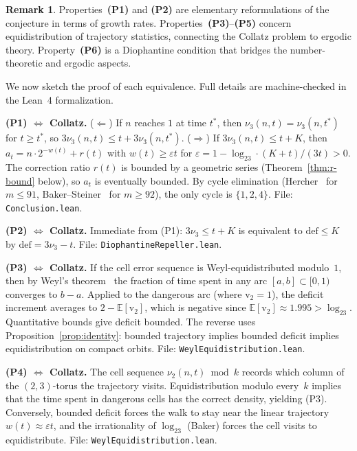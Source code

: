 \documentclass{CUP-JNL-FMP}%
\theoremstyle{definition}
\newtheorem{remark}[theorem]{Remark}
\numberwithin{equation}{section}
\newcommand{\val}{\mathrm{v}_2}
\newcommand{\deficit}{\mathrm{def}}
\newcommand{\logb}{\log_2}
\begin{document}
\begin{remark}
  Properties~\textbf{(P1)} and \textbf{(P2)} are elementary reformulations of
  the conjecture in terms of growth rates. Properties~\textbf{(P3)}--\textbf{(P5)}
  concern equidistribution of trajectory statistics, connecting the Collatz problem
  to ergodic theory. Property~\textbf{(P6)} is a Diophantine condition that
  bridges the number-theoretic and ergodic aspects.
\end{remark}

We now sketch the proof of each equivalence.  Full details
are machine-checked in the Lean~4 formalization.

\medskip\noindent\textbf{(P1) $\Leftrightarrow$ Collatz.}
($\Leftarrow$) If $n$ reaches $1$ at time $t^*$, then $\nu_3(n,t) = \nu_3(n,t^*)$
for $t \geq t^*$, so $3\nu_3(n,t) \leq t + 3\nu_3(n,t^*)$.
($\Rightarrow$) If $3\nu_3(n,t) \leq t + K$, then
$a_t = n \cdot 2^{-w(t)} + r(t)$ with $w(t) \geq \varepsilon t$ for
$\varepsilon = 1 - \logb 3 \cdot (K+t)/(3t) > 0$.  The correction ratio
$r(t)$ is bounded by a geometric series (Theorem~\ref{thm:r-bound} below),
so $a_t$ is eventually bounded.  By cycle elimination
(Hercher~\cite{Hercher2023} for $m \leq 91$, Baker--Steiner~\cite{Steiner1977}
for $m \geq 92$), the only cycle is $\{1,2,4\}$.
File: \texttt{Conclusion.lean}.

\medskip\noindent\textbf{(P2) $\Leftrightarrow$ Collatz.}
Immediate from (P1): $3\nu_3 \leq t + K$ is equivalent to $\deficit \leq K$
by $\deficit = 3\nu_3 - t$.  File: \texttt{DiophantineRepeller.lean}.

\medskip\noindent\textbf{(P3) $\Leftrightarrow$ Collatz.}
If the cell error sequence is Weyl-equidistributed modulo~$1$, then by
Weyl's theorem~\cite{Weyl1916} the fraction of time spent in any arc
$[a,b] \subset [0,1)$ converges to $b-a$.  Applied to the dangerous arc
(where $\val = 1$), the deficit increment averages to $2 - \mathbb{E}[\val]$,
which is negative since $\mathbb{E}[\val] \approx 1.995 > \logb 3$.
Quantitative bounds give deficit bounded.  The reverse uses
Proposition~\ref{prop:identity}: bounded trajectory implies bounded deficit
implies equidistribution on compact orbits.
File: \texttt{WeylEquidistribution.lean}.

\medskip\noindent\textbf{(P4) $\Leftrightarrow$ Collatz.}
The cell sequence $\nu_2(n,t) \bmod k$ records which column of the
$(2,3)$-torus the trajectory visits.  Equidistribution modulo every~$k$
implies that the time spent in dangerous cells has the correct density,
yielding (P3).  Conversely, bounded deficit forces the walk to stay near
the linear trajectory $w(t) \approx \varepsilon t$, and the irrationality
of $\logb 3$ (Baker) forces the cell visits to equidistribute.
File: \texttt{WeylEquidistribution.lean}.
\end{document}
